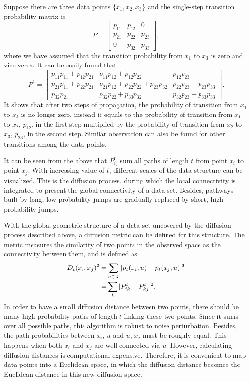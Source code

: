 Suppose there are three data points $\{x_1, x_2, x_3\}$ and the single-step transition probability matrix is
\begin{equation}
  P=\begin{bmatrix}
	p_{11} & p_{12} & 0\\
	p_{21} & p_{22} & p_{23} \\
	0      & p_{32} & p_{33}
\end{bmatrix},
\end{equation}
where we have assumed that the transition probability from $x_1$ to $x_3$ is zero and vice versa. It can be easily found that
\begin{equation}
  P^2=
  \begin{bmatrix}
  	p_{11}p_{11}+p_{12}p_{21} & p_{11}p_{12}+p_{12}p_{22} & p_{12}p_{23}\\
  	p_{21}p_{11}+p_{22}p_{21} & p_{21}p_{12}+p_{22}p_{22}+p_{23}p_{32} & p_{22}p_{23}+p_{23}p_{33} \\
  	p_{32}p_{21}      & p_{32}p_{22}+p_{33}p_{32} & p_{32}p_{23}+p_{33}p_{33}
  \end{bmatrix}.
\end{equation}
It shows that after two steps of propagation, the probability of transition from $x_1$ to $x_3$ is no longer zero, instead it equals to the probability of transition from $x_1$ to $x_2$, $p_{12}$, in the first step multiplied by the probability of transition from $x_2$ to $x_3$, $p_{23}$, in the second step. Similar observation can also be found for other transitions among the data points.

It can be seen from the above that $P^t_{ij}$ sum all paths of length $t$ from point $x_i$ to point $x_j$. With increasing value of $t$, different scales of the data structure can be visualized. This is the diffusion process, during which the local connectivity is integrated to present the global connectivity of a data set. Besides, pathways built by long, low probability jumps are gradually replaced by short, high probability jumps. 

With the global geometric structure of a data set uncovered by the diffusion process described above, a diffusion metric can be defined for this structure. The metric measures the similarity of two points in the observed space as the connectivity between them, and is defined as
\begin{align}
	D_t(x_i,x_j)^2=&\sum_{u\in X}|p_t(x_i,u)-p_t(x_j,u)|^2\notag\\
	              =&\sum_k |P_{ik}^t-P_{kj}^t|^2.
\end{align}
In order to have a small diffusion distance between two points, there should be many high probability paths of length $t$ linking these two points. Since it sums over all possible paths, this algorithm is robust to noise perturbation. Besides, the path probabilities between $x_i$, $u$ and $u$, $x_j$ must be roughly equal. This happens when both $x_i$ and $x_j$ are well connected via $u$. However, calculating diffusion distances is computational expensive. Therefore, it is convenient to map data points into a Euclidean space, in which the diffusion distance becomes the Euclidean distance in this new diffusion space. 

